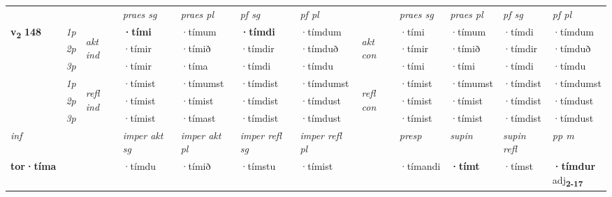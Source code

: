 \begin{longtable}[l]{X>{\footnotesize\itshape}llXXXXlXXXX}
\midrule

 & &   & \textit{praes sg}  & \textit{praes pl}    & \textit{ pf sg} & \textit{pf pl} & & \textit{praes sg}  & \textit{praes pl}    & \textit{pf sg} & \textit{pf pl }  \\ \cmidrule{4-7} \cmidrule{9-12}
 \multirow{2}{*}{{{\textbf{v{\textsubscript{2}}} \Large{\textbf{148}}}}}  & 1p & \multirow{3}{*}{\begin{turn}{90}\textit{akt ind}\end{turn}} & \textbf{·tími} & ·tímum & \textbf{·tímdi} & ·tímdum & \multirow{3}{*}{\begin{turn}{90}\textit{akt con}\end{turn}} &·tími & ·tímum & ·tímdi & ·tímdum\\*
 & 2p &  &  ·tímir  & ·tímið & ·tímdir & ·tímduð & & ·tímir & ·tímið & ·tímdir & ·tímduð \\*
 & 3p &  & ·tímir & ·tíma & ·tímdi & ·tímdu & & ·tími & ·tími& ·tímdi & ·tímdu \\*
\cmidrule{4-7} \cmidrule{9-12}
 & 1p & \multirow{3}{*}{\begin{turn}{90}\textit{refl ind}\end{turn}}  & ·tímist & ·tímumst & ·tímdist & ·tímdumst & \multirow{3}{*}{\begin{turn}{90}\textit{refl con}\end{turn}}  &·tímist & ·tímumst & ·tímdist & ·tímdumst \\*
 & 2p &  & ·tímist & ·tímist & ·tímdist & ·tímdust & &·tímist & ·tímist & ·tímdist & ·tímdust \\*
 & 3p  & & ·tímist & ·tímast & ·tímdist & ·tímdust & & ·tímist & ·tímist& ·tímdist & ·tímdust \\*
\cmidrule{4-7} \cmidrule{9-12}

   {\textit{inf}} & &  & \textit{imper akt sg} & \textit{imper akt pl} & \textit{imper refl sg} & \textit{imper refl pl} && \textit{presp} & \textit{supin} & \textit{supin refl} & \textit{pp m} \\*
  {\textbf{tor\allowbreak ·tíma}} & && ·tímdu  & ·tímið & ·tímstu & ·tímist && ·tímandi &  \textbf{·tímt} & ·tímst & \specialcell{\textbf{·tímdur} \\ adj\textbf{\textsubscript{2-17}}} \\*

\midrule


\end{longtable}
